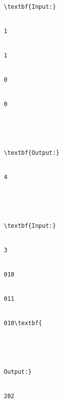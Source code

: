 \begin{verbatim}
\textbf{Input:}


1


1


0


0





\textbf{Output:}


4





\textbf{Input:}


3


010


011


010\textbf{





Output:}


202\end{verbatim}